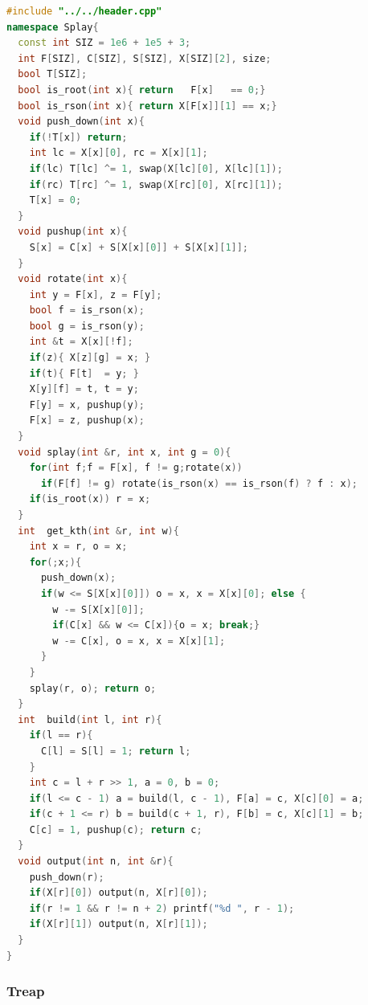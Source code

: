 \documentclass[10pt]{ctexart}
\begin{document}
\begin{multicols}{3}
\begin{lstlisting}[language={C++}]
#include "../../header.cpp"
namespace Splay{
  const int SIZ = 1e6 + 1e5 + 3;
  int F[SIZ], C[SIZ], S[SIZ], X[SIZ][2], size;
  bool T[SIZ];
  bool is_root(int x){ return   F[x]   == 0;}
  bool is_rson(int x){ return X[F[x]][1] == x;}
  void push_down(int x){
    if(!T[x]) return;
    int lc = X[x][0], rc = X[x][1];
    if(lc) T[lc] ^= 1, swap(X[lc][0], X[lc][1]);
    if(rc) T[rc] ^= 1, swap(X[rc][0], X[rc][1]);
    T[x] = 0;
  }
  void pushup(int x){
    S[x] = C[x] + S[X[x][0]] + S[X[x][1]];
  }
  void rotate(int x){
    int y = F[x], z = F[y];
    bool f = is_rson(x);
    bool g = is_rson(y);
    int &t = X[x][!f];
    if(z){ X[z][g] = x; }
    if(t){ F[t]  = y; }
    X[y][f] = t, t = y;
    F[y] = x, pushup(y);
    F[x] = z, pushup(x);
  }
  void splay(int &r, int x, int g = 0){
    for(int f;f = F[x], f != g;rotate(x))
      if(F[f] != g) rotate(is_rson(x) == is_rson(f) ? f : x);
    if(is_root(x)) r = x;
  }
  int  get_kth(int &r, int w){
    int x = r, o = x;
    for(;x;){
      push_down(x);
      if(w <= S[X[x][0]]) o = x, x = X[x][0]; else {
        w -= S[X[x][0]];
        if(C[x] && w <= C[x]){o = x; break;}
        w -= C[x], o = x, x = X[x][1];
      } 
    }
    splay(r, o); return o;
  }
  int  build(int l, int r){
    if(l == r){
      C[l] = S[l] = 1; return l;
    }
    int c = l + r >> 1, a = 0, b = 0;
    if(l <= c - 1) a = build(l, c - 1), F[a] = c, X[c][0] = a;
    if(c + 1 <= r) b = build(c + 1, r), F[b] = c, X[c][1] = b;
    C[c] = 1, pushup(c); return c;
  }
  void output(int n, int &r){
    push_down(r);
    if(X[r][0]) output(n, X[r][0]);
    if(r != 1 && r != n + 2) printf("%d ", r - 1);
    if(X[r][1]) output(n, X[r][1]);
  }
}
\end{lstlisting}

    \subsubsection{Treap}\label{treap}


\end{multicols}
\end{document}
